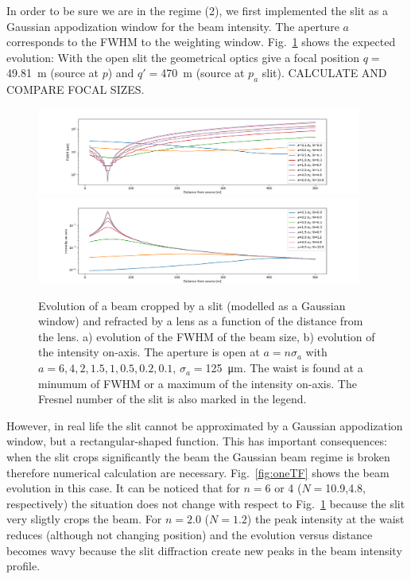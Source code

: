 \documentclass{iucr}              %
\begin{document}
In order to be sure we are in the regime (2), we first implemented the slit as a Gaussian appodization window for the beam intensity. The aperture $a$ corresponds to the FWHM to the weighting window. 
 Fig.~\ref{fig:oneTFG} shows the expected evolution: With the open slit the geometrical optics give a focal position $q=$\SI{49.81}{\meter} (source at $p$) and $q'=$\SI{470}{\meter} (source at $p_a$ slit). CALCULATE AND COMPARE FOCAL SIZES. 


\begin{figure}
    \centering
    \includegraphics[width=0.95\textwidth]{figures/FigureG_1.png}
    \includegraphics[width=0.95\textwidth]{figures/FigureG_2.png}
    \caption{Evolution of a beam cropped by a slit (modelled as a Gaussian window) and refracted by a lens as a function of the distance from the lens. a) evolution of the FWHM of the beam size, b) evolution of the intensity on-axis. The aperture is open at $a = n \sigma_a$ with $a=6,4,2,1.5,1,0.5,0.2,0.1$, $\sigma_a=$\SI{125}{\micro\meter}. The waist is found at a minumum of FWHM or a maximum of the intensity on-axis. The Fresnel number of the slit is also marked in the legend. }
    \label{fig:oneTFG}
\end{figure}

 
However, in real life the slit cannot be approximated by a Gaussian appodization window, but a rectangular-shaped function. This has important consequences: when the slit crops significantly the beam the Gaussian beam regime is broken therefore numerical calculation are necessary. Fig.~\ref{fig:oneTF} shows the beam evolution in this case.  It can be noticed that for $n=$6 or 4 ($N=$10.9,4.8, respectively) the situation does not change with respect to Fig.~\ref{fig:oneTFG} because the slit very sligtly crops the beam. For $n=2.0$ ($N=1.2$) the peak intensity at the waist reduces (although not changing position) and the evolution versus distance becomes wavy because the slit diffraction create new peaks in the beam intensity profile. 
\end{document}
